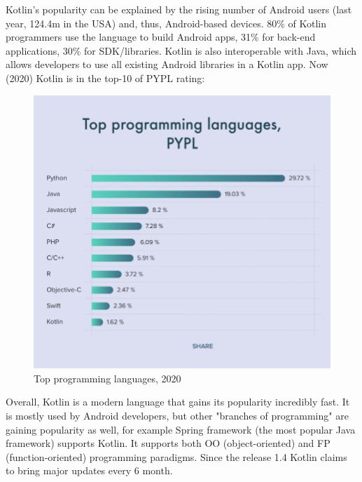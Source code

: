 Kotlin's popularity can be explained by the rising number of Android users (last year, 124.4m in the USA) and, thus, Android-based devices. 80\% of Kotlin programmers use the language to build Android apps, 31\% for back-end applications, 30\% for SDK/libraries.
Kotlin is also interoperable with Java, which allows developers to use all existing Android libraries in a Kotlin app. Now (2020) Kotlin is in the top-10 of PYPL rating:

\begin{figure}[H]
    \centering
    \includegraphics[scale = 0.3]{pictures/kotlinRating.png}
    \caption{Top programming languages, 2020}
    \label{fig:top_languages}
\end{figure}

Overall, Kotlin is a modern language that gains its popularity incredibly fast. It is mostly used by Android developers, but other "branches of programming" are gaining popularity as well, for example Spring framework (the most popular Java framework) supports Kotlin. It supports both OO (object-oriented) and FP (function-oriented) programming paradigms. Since the release 1.4 Kotlin claims to bring major updates every 6 month.